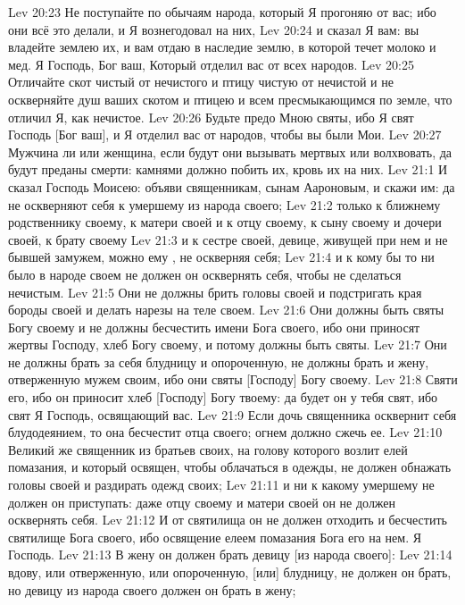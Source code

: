 \vs Lev 20:23 Не поступайте по обычаям народа, который Я прогоняю от вас; ибо они всё это делали, и Я вознегодовал на них,
\vs Lev 20:24 и сказал Я вам: вы владейте землею их, и вам отдаю в наследие землю, в которой течет молоко и мед. Я Господь, Бог ваш, Который отделил вас от всех народов.
\vs Lev 20:25 Отличайте скот чистый от нечистого и птицу чистую от нечистой и не оскверняйте душ ваших скотом и птицею и всем пресмыкающимся по земле, что отличил Я, как нечистое.
\vs Lev 20:26 Будьте предо Мною святы, ибо Я свят Господь [Бог ваш], и Я отделил вас от народов, чтобы вы были Мои.
\vs Lev 20:27 Мужчина ли или женщина, если будут они вызывать мертвых или волхвовать, да будут преданы смерти: камнями должно побить их, кровь их на них.
\vs Lev 21:1 И сказал Господь Моисею: объяви священникам, сынам Аароновым, и скажи им: да не оскверняют себя  к умершему из народа своего;
\vs Lev 21:2 только к ближнему родственнику своему, к матери своей и к отцу своему, к сыну своему и дочери своей, к брату своему
\vs Lev 21:3 и к сестре своей, девице, живущей при нем и не бывшей замужем, можно ему , не оскверняя себя;
\vs Lev 21:4 и  к кому бы то ни было в народе своем не должен он осквернять себя, чтобы не сделаться нечистым.
\vs Lev 21:5 Они не должны брить головы своей и подстригать края бороды своей и делать нарезы на теле своем.
\vs Lev 21:6 Они должны быть святы Богу своему и не должны бесчестить имени Бога своего, ибо они приносят жертвы Господу, хлеб Богу своему, и потому должны быть святы.
\vs Lev 21:7 Они не должны брать за себя блудницу и опороченную, не должны брать и жену, отверженную мужем своим, ибо они святы [Господу] Богу своему.
\vs Lev 21:8 Святи его, ибо он приносит хлеб [Господу] Богу твоему: да будет он у тебя свят, ибо свят Я Господь, освящающий вас.
\vs Lev 21:9 Если дочь священника осквернит себя блудодеянием, то она бесчестит отца своего; огнем должно сжечь ее.
\rsbpar\vs Lev 21:10 Великий же священник из братьев своих, на голову которого возлит елей помазания, и который освящен, чтобы облачаться в  одежды, не должен обнажать головы своей и раздирать одежд своих;
\vs Lev 21:11 и ни к какому умершему не должен он приступать: даже  отцу своему и матери своей он не должен осквернять себя.
\vs Lev 21:12 И от святилища он не должен отходить и бесчестить святилище Бога своего, ибо освящение елеем помазания Бога его на нем. Я Господь.
\vs Lev 21:13 В жену он должен брать девицу [из народа своего]:
\vs Lev 21:14 вдову, или отверженную, или опороченную, [или] блудницу, не должен он брать, но девицу из народа своего должен он брать в жену;
